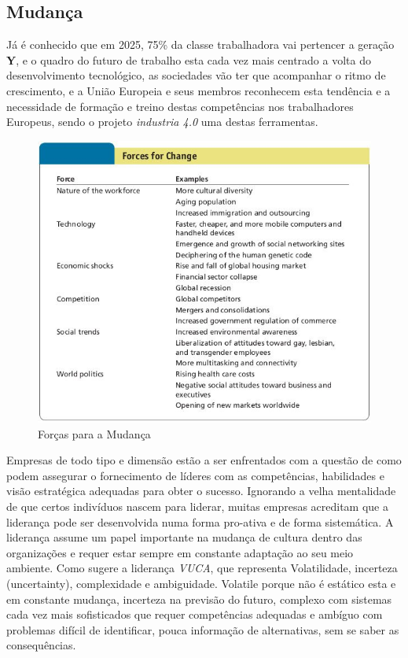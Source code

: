 \subsection{Mudança}
\qquad Já é conhecido que em \textsf{2025}, 75\% da classe trabalhadora vai pertencer a geração \textbf{Y}, e o quadro do futuro de trabalho esta cada vez mais centrado a volta do desenvolvimento tecnológico, as sociedades vão ter que acompanhar o ritmo de crescimento, e a União Europeia e seus membros reconhecem esta tendência e a necessidade de formação e treino destas competências nos trabalhadores Europeus, sendo o projeto \textit{industria 4.0} uma destas ferramentas.
\begin{figure}[H]
	\centering
	\includegraphics[scale=0.52]{./image/Change/Forces_for_Change.jpg}
	\caption{Forças para a Mudança \cite{book-7}}
\end{figure}
Empresas de todo tipo e dimensão estão a ser enfrentados com a questão de como podem assegurar o fornecimento de líderes com as competências, habilidades e visão estratégica adequadas para obter o sucesso. Ignorando a velha mentalidade de que certos indivíduos nascem para liderar, muitas empresas acreditam que a liderança pode ser desenvolvida numa forma pro-ativa e de forma sistemática. \cite{book-6}
\emptyline
A liderança assume um papel importante na mudança de cultura dentro das organizações e requer estar sempre em constante adaptação ao seu meio ambiente. Como sugere a liderança \textit{VUCA}, que representa Volatilidade, incerteza (uncertainty), complexidade e ambiguidade. Volatile porque não é estático esta e em constante mudança, incerteza na previsão do futuro, complexo com sistemas cada vez mais sofisticados que requer competências adequadas e ambíguo com problemas difícil de identificar, pouca informação de alternativas, sem se saber as consequências.
